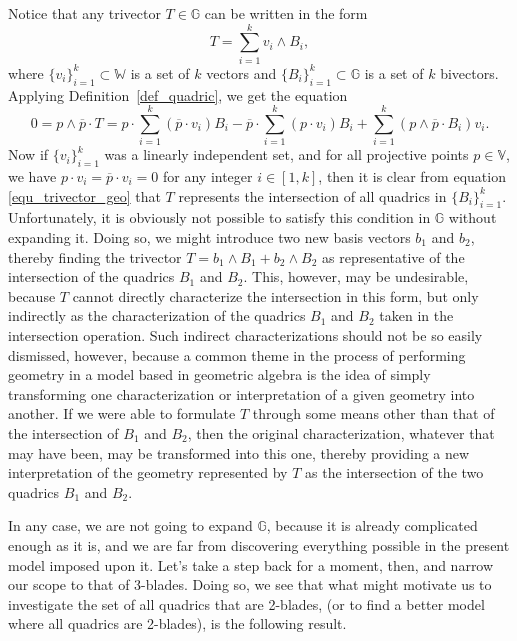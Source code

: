 \documentclass[12pt]{article}
\newcommand{\G}{\mathbb{G}}
\newcommand{\V}{\mathbb{V}}
\newcommand{\W}{\mathbb{W}}
\numberwithin{equation}{section}
\begin{document}
Notice that any trivector $T\in\G$ can be written in the form
\begin{equation}
T = \sum_{i=1}^k v_i\wedge B_i,
\end{equation}
where $\{v_i\}_{i=1}^k\subset\W$ is a set of $k$ vectors and $\{B_i\}_{i=1}^k\subset\G$
is a set of $k$ bivectors.  Applying Definition~\ref{def_quadric}, we get the equation
\begin{equation}\label{equ_trivector_geo}
0 = p\wedge\overline{p}\cdot T =
p\cdot\sum_{i=1}^k(\overline{p}\cdot v_i)B_i -
\overline{p}\cdot\sum_{i=1}^k(p\cdot v_i)B_i +
\sum_{i=1}^k(p\wedge\overline{p}\cdot B_i)v_i.
\end{equation}
Now if $\{v_i\}_{i=1}^k$ was a linearly independent set, and for all projective points $p\in\V$, we have $p\cdot v_i=\overline{p}\cdot v_i=0$
for any integer $i\in[1,k]$, then it is clear
from equation \eqref{equ_trivector_geo} that $T$ represents the intersection of all quadrics in $\{B_i\}_{i=1}^k$.
Unfortunately, it is obviously not possible to satisfy this condition in $\G$ without expanding it.
Doing so, we might introduce two new basis vectors $b_1$ and $b_2$, thereby finding the trivector
$T=b_1\wedge B_1+b_2\wedge B_2$ as representative of the intersection of the quadrics $B_1$ and $B_2$.
This, however, may be undesirable, because $T$ cannot directly characterize the intersection in this form, but
only indirectly as the characterization of the quadrics $B_1$ and $B_2$ taken in the intersection operation.
Such indirect characterizations should not be so easily dismissed, however, because a common theme
in the process of performing geometry in a model based in geometric algebra is the idea of simply transforming
one characterization or interpretation of a given geometry into another.  If we were able to formulate $T$ through some means
other than that of the intersection of $B_1$ and $B_2$, then the original characterization, whatever that may
have been, may be transformed into
this one, thereby providing a new interpretation of the geometry represented by $T$ as the intersection
of the two quadrics $B_1$ and $B_2$.

In any case, we are not going to expand $\G$, because it is already complicated enough as it is, and we
are far from discovering everything possible in the present model imposed upon it.
Let's take a step back for a moment, then, and narrow our scope to that of 3-blades.
Doing so, we see that
what might motivate us to investigate the set of all quadrics that are 2-blades, (or to find
a better model where all quadrics are 2-blades), is the following result.
\end{document}
